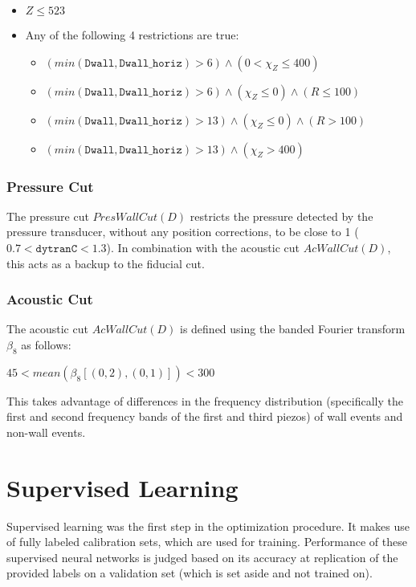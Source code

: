 \documentclass[10pt]{article}
\begin{document}
\begin{itemize}
    \item $Z \leq 523$
    \item Any of the following 4 restrictions are true:
    \begin{itemize}
        \item $(min(\texttt{Dwall}, \texttt{Dwall\_horiz}) > 6) \land (0 < \chi_{Z} \leq 400)$
        \item $(min(\texttt{Dwall}, \texttt{Dwall\_horiz}) > 6) \land (\chi_{Z} \leq 0) \land (R \leq 100)$
        \item $(min(\texttt{Dwall}, \texttt{Dwall\_horiz}) > 13) \land (\chi_{Z} \leq 0) \land (R > 100)$
        \item $(min(\texttt{Dwall}, \texttt{Dwall\_horiz}) > 13) \land (\chi_{Z} > 400)$
    \end{itemize}
\end{itemize}

\subsubsection{Pressure Cut}

The pressure cut $PresWallCut(D)$ restricts the pressure detected by the pressure transducer, without any position corrections, to be close to 1 ($0.7<\texttt{dytranC}<1.3$). In combination with the acoustic cut $AcWallCut(D)$, this acts as a backup to the fiducial cut.

\subsubsection{Acoustic Cut}

The acoustic cut $AcWallCut(D)$ is defined using the banded Fourier transform $\beta_{8}$ as follows:

$45 < mean(\beta_{8}[(0, 2), (0, 1)]) < 300$

This takes advantage of differences in the frequency distribution (specifically the first and second frequency bands of the first and third piezos) of wall events and non-wall events.

\section{Supervised Learning}

Supervised learning was the first step in the optimization procedure. It makes use of fully labeled calibration sets, which are used for training. Performance of these supervised neural networks is judged based on its accuracy at replication of the provided labels on a validation set (which is set aside and not trained on).
\end{document}
